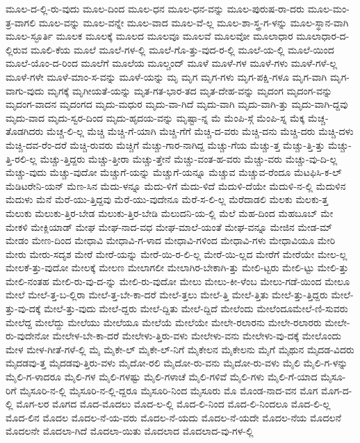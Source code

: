 {ಮೂಲ-ದ-ಲ್ಲಿ-ರು-ವುದು
ಮೂಲ-ದಿಂದ
ಮೂಲ-ಧನ
ಮೂಲ-ಧನ-ವನ್ನು
ಮೂಲ-ಪುರುಷ-ರಾ-ದರು
ಮೂಲ-ಮಂ-ತ್ರ-ವಾಗಲಿ
ಮೂಲ-ವನ್ನು
ಮೂಲ-ವನ್ನೇ
ಮೂಲ-ವಾದ
ಮೂಲ-ವೆ-ಲ್ಲ
ಮೂಲ-ಶಾ-ಸ್ತ್ರ-ಗ-ಳನ್ನು
ಮೂಲ-ಸ್ಥಾನ-ವಾಗಿ
ಮೂಲ-ಸ್ಫೂರ್ತಿ
ಮೂಲಕ
ಮೂಲಕ್ಕೆ
ಮೂಲದ
ಮೂಲವೂ
ಮೂಲವೆ
ಮೂಲವೋ
ಮೂಲಾಧಾರ
ಮೂಲಾಧಾರ-ದ-ಲ್ಲಿರುವ
ಮೂಲಿ-ಕೆಯ
ಮೂಲೆ
ಮೂಲೆ-ಗಳ-ಲ್ಲಿ
ಮೂಲೆ-ಗೊ-ತ್ತು-ವುದ-ರ-ಲ್ಲಿ
ಮೂಲೆ-ಯ-ಲ್ಲಿ
ಮೂಲೆ-ಯಿಂದ
ಮೂಲೆ-ಯೊಂ-ದ-ರಿಂದ
ಮೂಲೆಗೆ
ಮೂಲೆಯ
ಮೂಲ್ಚಂದ್
ಮೂಳೆ
ಮೂಳೆ-ಗಳ
ಮೂಳೆ-ಗಳು
ಮೂಳೆ-ಗಳೆ-ಲ್ಲ
ಮೂಳೆ-ಗಳೇ
ಮೂಳೆ-ಮಾಂ-ಸ-ವನ್ನು
ಮೂಳೆ-ಯನ್ನು
ಮೃ
ಮೃಗ
ಮೃಗ-ಗಳು
ಮೃಗ-ಪಕ್ಷಿ-ಗಳೂ
ಮೃಗ-ವಾಗಿ
ಮೃಗ-ವಾಗು-ವುದು
ಮೃಗಕ್ಕೆ
ಮೃಗೀಯತೆ-ಯನ್ನು
ಮೃತ-ಗತ-ಭಾರ-ತದ
ಮೃತ-ದೇಹ-ವನ್ನು
ಮೃದಂಗ
ಮೃದಂಗ-ವನ್ನು
ಮೃದಂಗ-ವಾದನ
ಮೃದಂಗದ
ಮೃದು-ಮಧುರ
ಮೃದು-ವಾ-ಗಿದೆ
ಮೃದು-ವಾಗಿ
ಮೃದು-ವಾಗಿ-ತ್ತು
ಮೃದು-ವಾಗಿ-ದ್ದವು
ಮೃದು-ವಾದ
ಮೃದು-ಸ್ವರ-ದಿಂದ
ಮೃದು-ಹೃದಯ-ವನ್ನು
ಮೃಷ್ಟಾ-ನ್ನ
ಮೆ
ಮೆಂಪಿ-ಸ್ಗೆ
ಮೆಂಪಿ-ಸ್ನ
ಮೆಕ್ಕ
ಮೆಚ್ಚ-ತೊಡಗಿದರು
ಮೆಚ್ಚ-ಲಿ-ಲ್ಲ
ಮೆಚ್ಚಿ
ಮೆಚ್ಚಿ-ಗೆ-ಯಾಗಿ
ಮೆಚ್ಚಿ-ಗೆಗೆ
ಮೆಚ್ಚಿ-ದ-ವರು
ಮೆಚ್ಚಿ-ದನು
ಮೆಚ್ಚಿ-ದರು
ಮೆಚ್ಚಿ-ದಳು
ಮೆಚ್ಚಿ-ದವ-ರೆಂ-ದರೆ
ಮೆಚ್ಚಿ-ರುವರು
ಮೆಚ್ಚಿಗೆ
ಮೆಚ್ಚು-ಗಾರ-ನಾಗಿದ್ದ
ಮೆಚ್ಚು-ಗೆಯ
ಮೆಚ್ಚು-ತ್ತ
ಮೆಚ್ಚು-ತ್ತಿ-ತ್ತು
ಮೆಚ್ಚು-ತ್ತಿ-ರಲಿ-ಲ್ಲ
ಮೆಚ್ಚು-ತ್ತಿದ್ದರು
ಮೆಚ್ಚು-ತ್ತೀರಾ
ಮೆಚ್ಚು-ತ್ತೇನೆ
ಮೆಚ್ಚು-ವಂತ-ಹ-ವರು
ಮೆಚ್ಚು-ವರು
ಮೆಚ್ಚು-ವು-ದಿ-ಲ್ಲ
ಮೆಚ್ಚು-ವುದು
ಮೆಚ್ಚು-ವುದೋ
ಮೆಚ್ಚುಗೆ-ಯನ್ನು
ಮೆಚ್ಚುಗೆ-ಯನ್ನೂ
ಮೆಚ್ಚುವ
ಮೆಚ್ಚುವ-ರೆಂದೂ
ಮೆಟಫಿಸಿ-ಕ-ಲ್
ಮೆಡಿಟರೇನಿ-ಯನ್
ಮೆಣ-ಸಿನ
ಮೆದು-ಳನ್ನೂ
ಮೆದು-ಳಿಗೆ
ಮೆದು-ಳಿದೆ
ಮೆದುಳಿ-ದೆಯೇ
ಮೆದುಳಿ-ನ-ಲ್ಲಿ
ಮೆದುಳಿನ
ಮೆದುಳು
ಮೆನೆ
ಮೆರೆ-ಯು-ತ್ತಿದ್ದವು
ಮೆರೆ-ಯು-ವುದೇನೂ
ಮೆರೆ-ಸ-ಲಿ-ಲ್ಲ
ಮೆರೆದಾಡಲಿ
ಮೆಲಕು
ಮೆಲಕು-ತ್ತ
ಮೆಲುಕು
ಮೆಲುಕು-ತ್ತಿರ-ಬೇಡ
ಮೆಲುಕು-ತ್ತಿರ-ಬೇಡಿ
ಮೆಲುದನಿ-ಯ-ಲ್ಲಿ
ಮೆಲೆ
ಮೆಹ-ದಿಂದ
ಮೆಹಬೂಬ್
ಮೇ
ಮೇಕಳಿ
ಮೇಕ್ಲಿಯಾಡ್
ಮೇಘ
ಮೇಘ-ನಾದ-ವಧ
ಮೇಘ-ಮಾಲೆ-ಯಂತೆ
ಮೇಘ-ವನ್ನೂ
ಮೇಜಿನ
ಮೇಡ-ಮ್
ಮೇಡಂ
ಮೇಣ-ದಿಂದ
ಮೇಧಾವಿ
ಮೇಧಾವಿ-ಗ-ಳಾದ
ಮೇಧಾವಿ-ಗಳಿಂದ
ಮೇಧಾವಿ-ಗಳು
ಮೇಧಾವಿಯೂ
ಮೇರಿ
ಮೇರು
ಮೇರು-ಸದೃಶ
ಮೇರೆ
ಮೇರೆ-ಯನ್ನು
ಮೇರೆ-ಯಿ-ರ-ಲಿ-ಲ್ಲ
ಮೇರೆ-ಯಿ-ಲ್ಲದ
ಮೇರೆಗೆ
ಮೇರೆಯೇ
ಮೇಲ-ಲ್ಲ
ಮೇಲಕೆ-ತ್ತು-ವುದೋ
ಮೇಲಕ್ಕೆ
ಮೇಲಣ
ಮೇಲಾಗಲೀ
ಮೇಲಾಗಿರ-ಬೇಕಾಗಿ-ತ್ತು
ಮೇಲಿ-ಟ್ಟರು
ಮೇಲಿ-ಟ್ಟು
ಮೇಲಿ-ತ್ತು
ಮೇಲಿ-ನಂತಹ
ಮೇಲಿ-ರು-ವು-ದ-ನ್ನು
ಮೇಲಿ-ರು-ವುದೋ
ಮೇಲು
ಮೇಲು-ಕೀ-ಳೆಂಬ
ಮೇಲು-ಗಡೆ-ಯಿಂದ
ಮೇಲೂ
ಮೇಲೆ
ಮೇಲೆ-ತ್ತ-ಬ-ಲ್ಲಿರಾ
ಮೇಲೆ-ತ್ತ-ಬೇ-ಕಾ-ದರೆ
ಮೇಲೆ-ತ್ತಲು
ಮೇಲೆ-ತ್ತಿ
ಮೇಲೆ-ತ್ತಿತು
ಮೇಲೆ-ತ್ತು-ತ್ತಿದ್ದರು
ಮೇಲೆ-ತ್ತು-ವು-ದಕ್ಕೆ
ಮೇಲೆ-ತ್ತು-ವುದು
ಮೇಲೆ-ದ್ದರು
ಮೇಲೆ-ದ್ದಿತು
ಮೇಲೆ-ದ್ದಿದೆ
ಮೇಲೆಂದು
ಮೇಲೆಂದೂಮೇಲೆ-ಣಿ-ಸುವರು
ಮೇಲೆದ್ದ
ಮೇಲೆದ್ದು
ಮೇಲೆಯು
ಮೇಲೆಯೂ
ಮೇಲೆಯೆ
ಮೇಲೆಯೇ
ಮೇಲೇ-ರಲಾರನು
ಮೇಲೇ-ರಲಾರರು
ಮೇಲೇ-ರು-ವುದೇನೋ
ಮೇಲೇಳ-ಬೇ-ಕಾ-ದರೆ
ಮೇಲೇಳು-ತ್ತಿರು-ವಳು
ಮೇಲೇಳು-ವನು
ಮೇಲೇಳು-ವು-ದಕ್ಕೆ
ಮೇಲೊಂದು
ಮೇಳ
ಮೇಳ-ಗೀತೆ-ಗಳೆ-ಲ್ಲಿ
ಮೈ
ಮೈಕೇ-ಲ್
ಮೈಕೇ-ಲ್-ನಿಗೆ
ಮೈಕೇಲನ
ಮೈಕೇಲನು
ಮೈಗೆ
ಮೈಥುನ
ಮೈದಡ-ವಿದರು
ಮೈದಡವು-ತ್ತ
ಮೈದಡವು-ತ್ತಿರು-ವಳು
ಮೈದೋ-ರಲಿ
ಮೈದೋ-ರು-ವನು
ಮೈದೋ-ರು-ವಳು
ಮೈಲಿ
ಮೈಲಿ-ಗ-ಳನ್ನು
ಮೈಲಿ-ಗ-ಳಾದರೂ
ಮೈಲಿ-ಗಳ
ಮೈಲಿ-ಗಳಷ್ಟು
ಮೈಲಿ-ಗಳಾಚೆ
ಮೈಲಿ-ಗಳಿವೆ
ಮೈಲಿ-ಗಳು
ಮೈಲಿ-ಗೆ-ಯಾದ
ಮೈಸೂ-ರಿಗೆ
ಮೈಸೂರಿ-ನ-ಲ್ಲಿ
ಮೈಸೂರಿ-ನ-ಲ್ಲಿ-ದ್ದರೂ
ಮೈಸೂರಿ-ನಿಂದ
ಮೈಸೂರು
ಮೊ
ಮೊಂಡ-ನಾದ-ವನ
ಮೊಗ
ಮೊಗ-ದ-ಲ್ಲಿ
ಮೊಗ-ಲರ
ಮೊಗದ
ಮೊದ-ಮೊದಲು
ಮೊದ-ಲ-ಲ್ಲಿ
ಮೊದ-ಲಿ-ನಿಂದ
ಮೊದ-ಲಿ-ನಿಂದಲೂ
ಮೊದ-ಲಿ-ಲ್ಲ
ಮೊದ-ಲಿನ
ಮೊದಲ
ಮೊದಲ-ನೆ-ಯ-ವರು
ಮೊದಲ-ನೆ-ಯದು
ಮೊದಲ-ನೆ-ಯದೇ
ಮೊದಲ-ನೆಯ
ಮೊದಲನೆ
ಮೊದಲನೇ
ಮೊದಲಾ-ಗಿದೆ
ಮೊದಲಾ-ಯಿತು
ಮೊದಲಾದ
ಮೊದಲಾದ-ವು-ಗಳ-ಲ್ಲಿ
}
